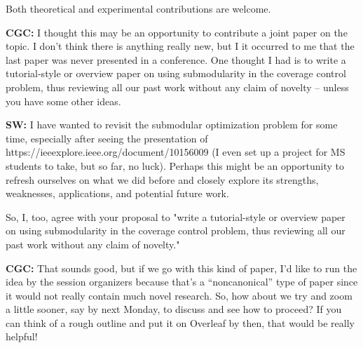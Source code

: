 \documentclass[letterpaper, 10 pt, conference]{ieeeconf}
\begin{document}
Both theoretical and experimental contributions are welcome. 

\textbf{CGC:} I thought this may be an opportunity to contribute a joint paper on the topic. I don’t think there is anything really new, but I it occurred to me that the last paper was never presented in a conference. One thought I had is to write a tutorial-style or overview paper on using submodularity in the coverage control problem, thus reviewing all our past work without any claim of novelty – unless you have some other ideas.

\textbf{SW:} I have wanted to revisit the submodular optimization problem for some time, especially after seeing the presentation of https://ieeexplore.ieee.org/document/10156009 (I even set up a project for MS students to take, but so far, no luck). Perhaps this might be an opportunity to refresh ourselves on what we did before and closely explore its strengths, weaknesses, applications, and potential future work.  

So, I, too, agree with your proposal to "write a tutorial-style or overview paper on using submodularity in the coverage control problem, thus reviewing all our past work without any claim of novelty." 

\textbf{CGC:} That sounds good, but if we go with this kind of paper, I’d like to run the idea by the session organizers because that’s a “noncanonical” type of paper since it would not really contain much novel research. So, how about we try and zoom a little sooner, say by next Monday, to discuss and see how to proceed? If you can think of a rough outline and put it on Overleaf by then, that would be really helpful!
\end{document}
